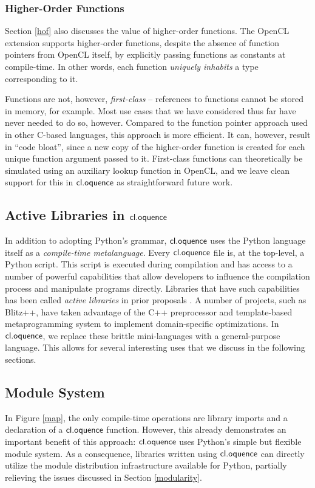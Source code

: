 \documentclass{llncs}
\begin{document}
\subsubsection{Higher-Order Functions}
Section \ref{hof} also discusses the value of higher-order functions. The OpenCL extension supports higher-order functions, despite the absence of function pointers from OpenCL itself, by explicitly passing functions as constants at compile-time. In other words, each function {\it uniquely inhabits} a type corresponding to it.

Functions are not, however, {\it first-class} -- references to functions cannot be stored in memory, for example. Most use cases that we have considered thus far have never needed to do so, however. Compared to the function pointer approach used in other C-based languages, this approach is more efficient. It can, however, result in ``code bloat'', since a new copy of the higher-order function is created for each unique function argument passed to it. First-class functions can theoretically be simulated using an auxiliary lookup function in OpenCL, and we leave clean support for this in $\textsf{cl.oquence}$ as straightforward future work.

\subsection{Active Libraries in $\textsf{cl.oquence}$}
In addition to adopting Python's grammar, $\textsf{cl.oquence}$ uses the Python language itself as a {\it compile-time metalanguage}. Every $\textsf{cl.oquence}$ file is, at the top-level, a Python script. This script is executed during compilation and has access to a number of powerful capabilities that allow developers to influence the compilation process and manipulate programs directly. Libraries that have such capabilities has been called {\it active libraries} in prior proposals \cite{activelibraries}. A number of  projects, such as Blitz++, have taken advantage of the C++ preprocessor and template-based metaprogramming system to implement domain-specific optimizations. In $\textsf{cl.oquence}$, we replace these brittle mini-languages with a general-purpose language. This allows for several interesting uses that we discuss in the following sections.

\subsection{Module System}
In Figure \ref{map}, the only compile-time operations are library imports and a declaration of a $\textsf{cl.oquence}$ function. However, this already demonstrates an important benefit of this approach: $\textsf{cl.oquence}$ uses Python's simple but flexible module system. As a consequence, libraries written using $\textsf{cl.oquence}$ can directly utilize the module distribution infrastructure available for Python, partially relieving the issues discussed in Section \ref{modularity}.
\end{document}
